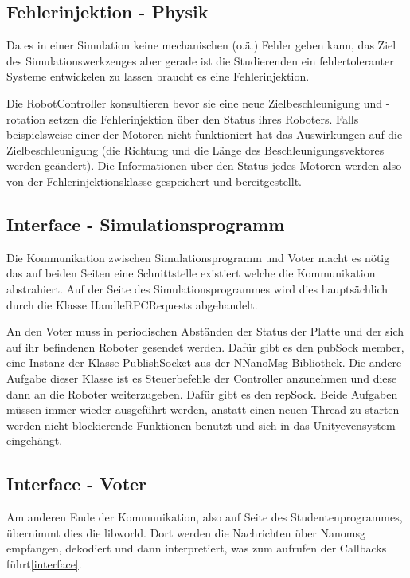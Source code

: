 \subsection{Fehlerinjektion - Physik}
Da es in einer Simulation keine mechanischen (o.{\"{a}}.) Fehler geben kann, das Ziel des Simulationswerkzeuges aber gerade ist
die Studierenden ein fehlertoleranter Systeme entwickelen zu lassen braucht es eine Fehlerinjektion.

Die RobotController konsultieren bevor sie eine neue Zielbeschleunigung und -rotation setzen die Fehlerinjektion {\"{u}}ber den
Status ihres Roboters. Falls beispielsweise einer der Motoren nicht funktioniert hat das Auswirkungen auf die Zielbeschleunigung
(die Richtung und die L{\"{a}}nge des Beschleunigungsvektores werden ge{\"{a}}ndert). Die Informationen {\"{u}}ber den Status
jedes Motoren werden also von der Fehlerinjektionsklasse gespeichert und bereitgestellt.

\subsection{Interface - Simulationsprogramm}
Die Kommunikation zwischen Simulationsprogramm und Voter macht es n{\"{o}}tig das auf beiden Seiten eine Schnittstelle existiert
welche die Kommunikation abstrahiert. Auf der Seite des Simulationsprogrammes wird dies haupts{\"{a}}chlich durch die Klasse
HandleRPCRequests abgehandelt.

An den Voter muss in periodischen Abst{\"{a}}nden der Status der Platte und der sich auf ihr befindenen Roboter gesendet werden.
Daf{\"{u}}r gibt es den pubSock member, eine Instanz der Klasse PublishSocket aus der NNanoMsg Bibliothek. Die andere Aufgabe
dieser Klasse ist es Steuerbefehle der Controller anzunehmen und diese dann an die Roboter weiterzugeben. Daf{\"{u}}r gibt es
den repSock. Beide Aufgaben m{\"{u}}ssen immer wieder ausgef{\"{u}}hrt werden, anstatt einen neuen Thread zu starten werden
nicht-blockierende Funktionen benutzt und sich in das Unityevensystem eingeh{\"{a}}ngt.

\subsection{Interface - Voter}
Am anderen Ende der Kommunikation, also auf Seite des Studentenprogrammes, {\"{u}}bernimmt dies die libworld. Dort werden die
Nachrichten {\"{u}}ber Nanomsg empfangen, dekodiert und dann interpretiert, was zum aufrufen der Callbacks f{\"{u}}hrt\ref{interface}.

